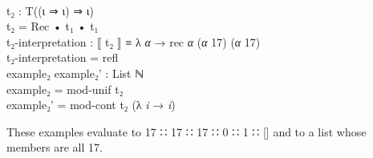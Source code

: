\documentclass{entcs} \usepackage{prentcsmacro}
\newcommand{\AgdaFontStyle}[1]{\textsf{#1}}
\newcommand{\AgdaBoundFontStyle}[1]{\textit{#1}}
\newcommand{\AgdaNumber}      [1]{\textcolor{AgdaNumber}{#1}}
\newcommand{\AgdaSymbol}      [1]{\textcolor{AgdaSymbol}{#1}}
\newcommand{\AgdaBound}    [1]{\AgdaBoundFontStyle{\textcolor{AgdaBound}{#1}}}
\newcommand{\AgdaInductiveConstructor}[1]
    {\AgdaFontStyle{\textcolor{AgdaInductiveConstructor}{#1}}}
\newcommand{\AgdaDatatype} [1]{\AgdaFontStyle{\textcolor{AgdaDatatype}{#1}}}
\newcommand{\AgdaFunction} [1]{\AgdaFontStyle{\textcolor{AgdaFunction}{#1}}}
\newcommand{\AgdaCodeStyle}{\small}
\newenvironment{code}%
{\noindent\AgdaCodeStyle\pboxed}%
{\endpboxed\par\noindent%
\ignorespacesafterend}
\begin{document}
\begin{code}\>\<%
\\
\>\AgdaFunction{t₂} \AgdaSymbol{:} \AgdaDatatype{T}\AgdaSymbol{((}\AgdaInductiveConstructor{ι} \AgdaInductiveConstructor{⇒} \AgdaInductiveConstructor{ι}\AgdaSymbol{)} \AgdaInductiveConstructor{⇒} \AgdaInductiveConstructor{ι}\AgdaSymbol{)}\<%
\\
\>\AgdaFunction{t₂} \AgdaSymbol{=} \AgdaInductiveConstructor{Rec} \AgdaFunction{•} \AgdaFunction{t₁} \AgdaFunction{•} \AgdaFunction{t₁}\<%
\\
\>\AgdaFunction{t₂-interpretation} \AgdaSymbol{:} \AgdaFunction{⟦} \AgdaFunction{t₂} \AgdaFunction{⟧} \AgdaDatatype{≡} \AgdaSymbol{λ} \AgdaBound{α} \AgdaSymbol{→} \AgdaFunction{rec} \AgdaBound{α} \AgdaSymbol{(}\AgdaBound{α} \AgdaNumber{17}\AgdaSymbol{)} \AgdaSymbol{(}\AgdaBound{α} \AgdaNumber{17}\AgdaSymbol{)}\<%
\\
\>\AgdaFunction{t₂-interpretation} \AgdaSymbol{=} \AgdaInductiveConstructor{refl}\<%
\\
\>\AgdaFunction{example₂} \AgdaFunction{example₂'} \AgdaSymbol{:} \AgdaDatatype{List} \AgdaDatatype{ℕ}\<%
\\
\>\AgdaFunction{example₂} \AgdaSymbol{=} \AgdaFunction{mod-unif} \AgdaFunction{t₂}\<%
\\
\>\AgdaFunction{example₂'} \AgdaSymbol{=} \AgdaFunction{mod-cont} \AgdaFunction{t₂} \AgdaSymbol{(λ} \AgdaBound{i} \AgdaSymbol{→} \AgdaBound{i}\AgdaSymbol{)}\<%
\\
\>\<\end{code}
These examples evaluate to 17 ∷ 17 ∷ 17 ∷ 0 ∷ 1 ∷ []
and to a list whose members are all 17.
\end{document}
